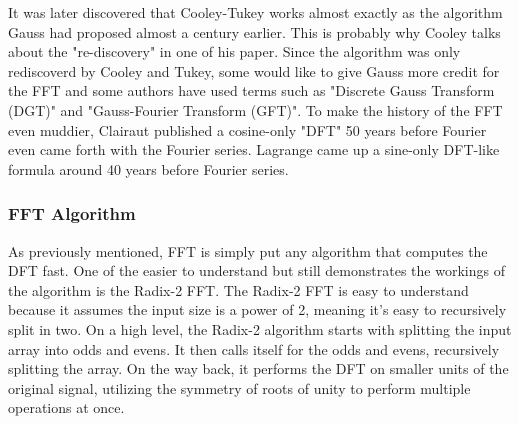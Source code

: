 
It was later discovered that Cooley-Tukey works almost exactly as the algorithm Gauss had proposed almost a century earlier. This is probably why Cooley talks about the "re-discovery" in one of his paper. Since the algorithm was only rediscoverd by Cooley and Tukey, some would like to give Gauss more credit for the FFT and some authors have used terms such as "Discrete Gauss Transform (DGT)" and "Gauss-Fourier Transform (GFT)". To make the history of the FFT even muddier, Clairaut published a cosine-only "DFT" 50 years before Fourier even came forth with the Fourier series. Lagrange came up a sine-only DFT-like formula around 40 years before Fourier series.







\subsubsection{FFT Algorithm}
As previously mentioned, FFT is simply put any algorithm that computes the DFT fast. One of the easier to understand but still demonstrates the workings of the algorithm is the Radix-2 FFT. The Radix-2 FFT is easy to understand because it assumes the input size is a power of 2, meaning it's easy to recursively split in two. On a high level, the Radix-2 algorithm starts with splitting the input array into odds and evens. It then calls itself for the odds and evens, recursively splitting the array. On the way back, it performs the DFT on smaller units of the original signal, utilizing the symmetry of roots of unity to perform multiple operations at once. 

